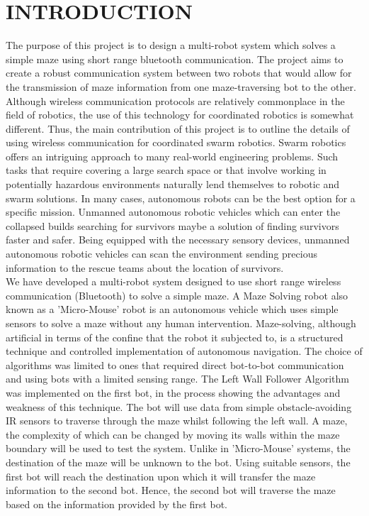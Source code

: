 \section{INTRODUCTION}
The purpose of this project is to design a multi-robot system which solves a simple maze using short range bluetooth communication. The project aims to create a robust communication system between two robots that would allow for the transmission of maze information from one maze-traversing bot to the other. \\
Although wireless communication protocols are relatively commonplace in the field of robotics, the use of this technology for coordinated robotics is somewhat different. Thus, the main contribution of this project is to outline the details of using wireless communication for coordinated swarm robotics.
Swarm robotics offers an intriguing approach to many real-world engineering problems. Such tasks that require covering a large search space or that involve working in potentially hazardous environments naturally lend themselves to robotic and swarm solutions. In many cases, autonomous robots can be the best option for a specific mission. Unmanned autonomous robotic vehicles which can enter the collapsed builds searching for survivors maybe a solution of finding survivors faster and safer. Being equipped with the necessary sensory devices, unmanned autonomous robotic vehicles can scan the environment sending precious information to the rescue teams about the location of survivors.\\
We have developed a multi-robot system designed to use short range wireless communication (Bluetooth) to solve a simple maze. A Maze Solving robot also known as a 'Micro-Mouse' robot is an autonomous vehicle which uses simple sensors to solve a maze without any human intervention. Maze-solving, although artificial in terms of the confine that the robot it subjected to, is a structured technique and controlled implementation of autonomous navigation. The choice of algorithms was limited to ones that required direct bot-to-bot communication and using bots with a limited sensing range. The Left Wall Follower Algorithm was implemented on the first bot, in the process showing the advantages and weakness of this technique. The bot will use data from simple obstacle-avoiding IR sensors to traverse through the maze whilst following the left wall. A maze, the complexity of which can be changed by moving its walls within the maze boundary will be used to test the system. Unlike in 'Micro-Mouse' systems, the destination of the maze will be unknown to the bot. Using suitable sensors, the first bot will reach the destination upon which it will transfer the maze information to the second bot. Hence, the second bot will traverse the maze based on the information provided by the first bot. 
